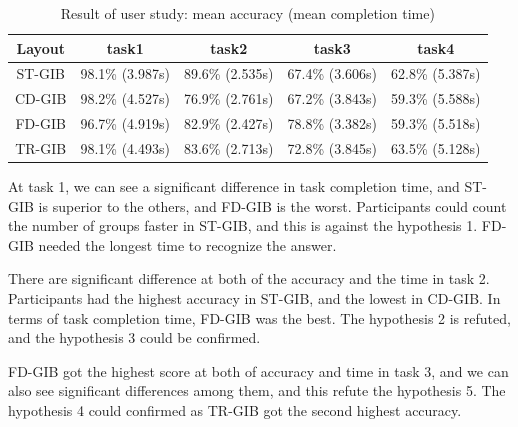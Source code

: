 \documentclass{llncs}
\begin{document}

\begin{table}[htb]
  \begin{center}
    \begin{tabular}{|c||c|c|c|c|} \hline
      Layout & task1 & task2 & task3 & task4 \\ \hline \hline
      ST-GIB & 98.1\% (3.987s) & 89.6\% (2.535s) & 67.4\% (3.606s) & 62.8\% (5.387s) \\ \hline
      CD-GIB & 98.2\% (4.527s) & 76.9\% (2.761s) & 67.2\% (3.843s) & 59.3\% (5.588s)\\ \hline
      FD-GIB & 96.7\% (4.919s) & 82.9\% (2.427s) & 78.8\% (3.382s) & 59.3\% (5.518s)\\ \hline
      TR-GIB & 98.1\% (4.493s) & 83.6\% (2.713s) & 72.8\% (3.845s) & 63.5\% (5.128s)\\ \hline
    \end{tabular}
  \end{center}
   \caption{Result of user study: mean accuracy (mean completion time)}
  \label{user-result}
\end{table}

At task 1, we can see a significant difference in task completion time, and ST-GIB is superior to the others, and FD-GIB is the worst.
Participants could count the number of groups faster in ST-GIB, and this is against the hypothesis 1.
FD-GIB needed the longest time to recognize the answer.

There are significant difference at both of the accuracy and the time in task 2.
Participants had the highest accuracy in ST-GIB, and the lowest in CD-GIB.
In terms of task completion time, FD-GIB was the best.
The hypothesis 2 is refuted, and the hypothesis 3 could be confirmed.


FD-GIB got the highest score at both of accuracy and time in task 3, and we can also see significant differences among them, and this refute the hypothesis 5.
The hypothesis 4 could confirmed as TR-GIB got the second highest accuracy.
\end{document}
